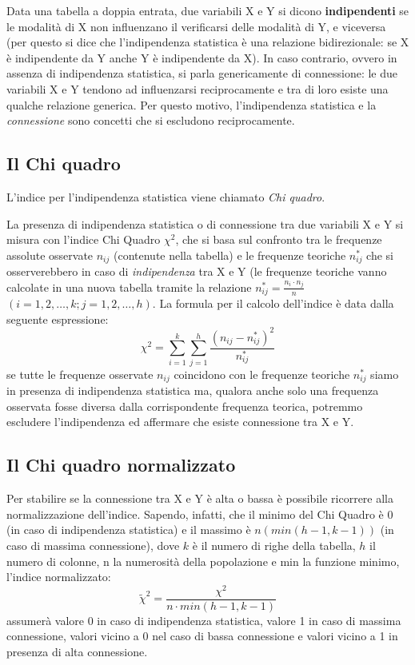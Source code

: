 Data una tabella a doppia entrata, due variabili X e Y si dicono 
\textbf{indipendenti} se le modalità di X non influenzano il verificarsi 
delle modalità di Y, e viceversa (per questo si dice che l'indipendenza 
statistica è una relazione bidirezionale: se X è indipendente da Y anche Y 
è indipendente da X). In caso contrario, ovvero in assenza di indipendenza 
statistica, si parla genericamente di connessione: le due variabili X e Y 
tendono ad influenzarsi reciprocamente e tra di loro esiste una qualche 
relazione generica. Per questo motivo, l'indipendenza statistica e la 
\emph{connessione} sono concetti che si escludono reciprocamente.

\subsection{Il Chi quadro}
\label{subsec:stat02_chiquadro}

L'indice per l'indipendenza statistica viene chiamato \emph{Chi quadro}.

La presenza di indipendenza statistica o di connessione tra due variabili X 
e Y si misura con l'indice Chi Quadro \(\chi^2\), che si basa sul confronto 
tra le frequenze assolute osservate  \(n_{ij}\) (contenute nella tabella) e 
le frequenze teoriche \(n^*_{ij}\) che si osserverebbero in caso di 
\emph{indipendenza} tra X e Y (le frequenze teoriche vanno calcolate 
in una nuova tabella  tramite la relazione \(n^*_{ij}=\frac{n_i\cdot 
n_j}{n}\) \((i=1,2,\dots,k; j=1,2,\dots,h)\). La formula per il calcolo 
dell'indice è data dalla seguente espressione: 
\[\chi^2 = \sum_{i=1}^{k}\sum_{j=1}^{h}\frac{\left(n_{ij}-n^*_{ij}\right) 
^2}{n^*_{ij}}\]
se tutte le frequenze osservate \(n_{ij}\) coincidono con le frequenze 
teoriche \(n^*_{ij}\) siamo in presenza di indipendenza statistica ma, 
qualora anche solo una frequenza osservata fosse diversa dalla 
corrispondente frequenza teorica, potremmo escludere l'indipendenza ed 
affermare che esiste connessione tra X e Y.

\subsection{Il Chi quadro normalizzato}
\label{subsec:stat02_chi_normalizzato}

 Per stabilire se la connessione tra X e Y è alta o bassa è possibile 
ricorrere alla normalizzazione dell'indice. Sapendo, infatti, che il minimo 
del Chi Quadro è 0 (in caso di indipendenza statistica) e il massimo è 
\(n(min(h-1,k-1))\)  (in caso di massima connessione), dove \(k\) è il numero 
di righe della tabella, \(h\) il numero di colonne, n la numerosità della 
popolazione e min la funzione minimo, l'indice normalizzato:
 \[\widetilde{\chi}^2=\frac{\chi^2}{n\cdot min(h-1,k-1)}\]
 assumerà valore 0 in caso di indipendenza statistica, valore 1 in caso di 
massima connessione, valori vicino a 0 nel caso di bassa connessione e 
valori vicino a 1 in presenza di alta connessione.

